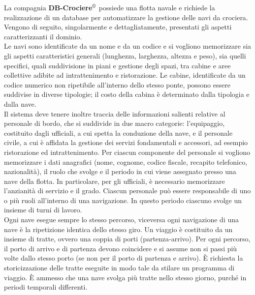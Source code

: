 \documentclass[a4paper, titlepage]{report}
\begin{document}
	\begin{linenumbers}
	\noindent
	La compagnia \textbf{DB-Crociere}$^{\copyright}$ possiede una flotta navale e richiede la realizzazione di un database per automatizzare la gestione delle navi da crociera. Vengono di seguito, singolarmente e dettagliatamente, presentati gli aspetti caratterizzanti il dominio. \\
	
	\noindent
	Le navi sono identificate da un nome e da un codice e si vogliono memorizzare sia gli aspetti caratteristici generali (lunghezza, larghezza, altezza e peso), sia quelli specifici, quali suddivisione in piani e gestione degli spazi, tra cabine e aree collettive adibite ad  intrattenimento e ristorazione. Le cabine, identificate da un codice numerico non ripetibile all'interno dello stesso ponte, possono essere suddivise in diverse tipologie; il costo della cabina è determinato dalla tipologia e dalla nave. \\
	
	\noindent
	Il sistema deve tenere inoltre traccia delle informazioni salienti relative al personale di bordo, che si suddivide in due macro categorie: l'equipaggio, costituito dagli ufficiali, a cui spetta la conduzione della nave, e il personale civile, a cui è affidata la gestione dei servizi fondamentali e accessori, ad esempio ristorazione ed intrattenimento. Per ciascun componente del personale si vogliono memorizzare i dati anagrafici (nome, cognome, codice fiscale, recapito telefonico, nazionalità), il ruolo che svolge e il periodo in cui viene assegnato presso una nave della flotta. In particolare, per gli ufficiali, è necessario memorizzare l'anzianità di servizio e il grado. Ciascun personale può essere responsabile di uno o più ruoli all'interno di una navigazione. In questo periodo ciascuno svolge un insieme di turni di lavoro.  \\

	\noindent	
	Ogni nave esegue sempre lo stesso percorso, viceversa ogni navigazione di una nave è la ripetizione identica dello stesso giro. Un viaggio è costituito da un insieme di tratte, ovvero una coppia di porti (partenza-arrivo). Per ogni percorso, il porto di arrivo e di partenza devono coincidere e si assume non si passi più volte dallo stesso porto (se non per il porto di partenza e arrivo). È richiesta la storicizzazione delle tratte eseguite in modo tale da stilare un programma di viaggio. È ammesso che una nave svolga più tratte nello stesso giorno, purché in periodi temporali differenti. \\
	

\end{linenumbers}
\end{document}
